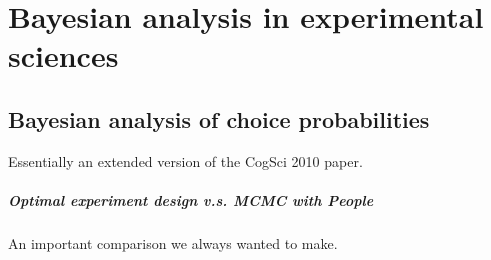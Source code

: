 \part{Bayesian analysis in experimental sciences}
\chapter{Bayesian analysis of choice probabilities}
Essentially an extended version of the CogSci 2010 paper.
\subsubsection{Optimal experiment design v.s. MCMC with People}
An important comparison we always wanted to make.


